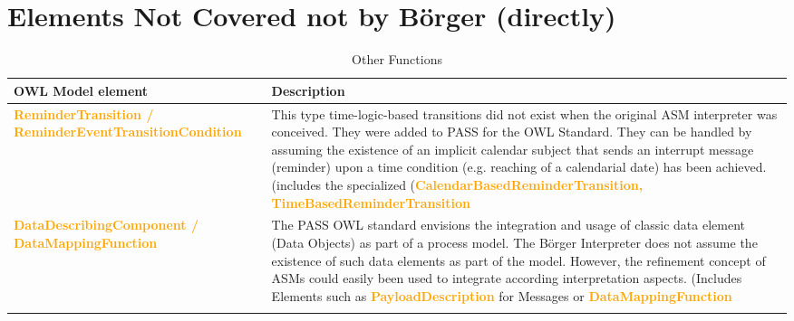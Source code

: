 \section{Elements Not Covered not by Börger (directly)}
\begin{landscape}
	\begin {longtable} {| p{} | p{} | }
	\hline
	OWL Model element &    Description\\
	\toprule
	\endhead
	\hline
\textcolor{orange}{\textbf{ReminderTransition / ReminderEventTransitionCondition  }}
&This type time-logic-based transitions did not exist when the original ASM interpreter was conceived. They were added to PASS for the OWL Standard. They can be handled by assuming the existence of an implicit calendar subject that sends an interrupt message (reminder) upon a time condition (e.g. reaching of a calendarial date) has been achieved.
(includes the specialized (\textcolor{orange}{\textbf{CalendarBasedReminderTransition, TimeBasedReminderTransition}}

\\

	\hline
\textcolor{orange}{\textbf{DataDescribingComponent / DataMappingFunction }}
&The PASS OWL standard envisions the integration and usage of classic data element (Data Objects) as part of a process model. The Börger Interpreter does not assume the existence of such data elements as part of the model. However, the refinement concept of ASMs could easily been used to integrate according interpretation aspects.
(Includes Elements such as \textcolor{orange}{\textbf{PayloadDescription }} for Messages or \textcolor{orange}{\textbf{DataMappingFunction }}

\\
	\hline
\caption{Other Functions}
\label{tab:In ASM not covered}
\end{longtable}
\end{landscape}
